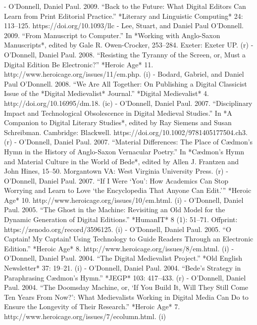 - O'Donnell, Daniel Paul. 2009. “Back to the Future: What Digital Editors Can Learn from Print Editorial Practice.” *Literary and Linguistic Computing* 24: 113–125. https:/\allowbreak{}/\allowbreak{}doi.org/\allowbreak{}10.1093/\allowbreak{}llc%
- Lee, Stuart, and Daniel Paul O'Donnell. 2009. “From Manuscript to Computer.” In *Working with Anglo-Saxon Manuscripts*, edited by Gale R. Owen-Crocker, 253–284. Exeter: Exeter UP. (r)
- O'Donnell, Daniel Paul. 2008. “Resisting the Tyranny of the Screen, or, Must a Digital Edition Be Electronic?” *Heroic Age* 11. http:/\allowbreak{}/\allowbreak{}www.heroicage.org/\allowbreak{}issues/\allowbreak{}11/\allowbreak{}em.php. (i)
- Bodard, Gabriel, and Daniel Paul O'Donnell. 2008. “We Are All Together: On Publishing a Digital Classicist Issue of the *Digital Medievalist* Journal.” *Digital Medievalist* 4. http:/\allowbreak{}/\allowbreak{}doi.org/\allowbreak{}10.16995/\allowbreak{}dm.18. (ic)
- O'Donnell, Daniel Paul. 2007. “Disciplinary Impact and Technological Obsolescence in Digital Medieval Studies.” In *A Companion to Digital Literary Studies*, edited by Ray Siemens and Susan Schreibman. Cambridge: Blackwell. https:/\allowbreak{}/\allowbreak{}doi.org/\allowbreak{}10.1002/\allowbreak{}9781405177504.ch3. (r)
- O'Donnell, Daniel Paul. 2007. “Material Differences: The Place of Cædmon's Hymn in the History of Anglo-Saxon Vernacular Poetry.” In *Cædmon's Hymn and Material Culture in the World of Bede*, edited by Allen J. Frantzen and John Hines, 15–50. Morgantown VA: West Virginia University Press. (r)
- O'Donnell, Daniel Paul. 2007. “If I Were ‘You’: How Academics Can Stop Worrying and Learn to Love ‘the Encyclopedia That Anyone Can Edit.’” *Heroic Age* 10. http:/\allowbreak{}/\allowbreak{}www.heroicage.org/\allowbreak{}issues/\allowbreak{}10/\allowbreak{}em.html. (i)
- O'Donnell, Daniel Paul. 2005. “The Ghost in the Machine: Revisiting an Old Model for the Dynamic Generation of Digital Editions.” *HumanIT* 8 (1): 51–71. Offprint: https:/\allowbreak{}/\allowbreak{}zenodo.org/\allowbreak{}record/\allowbreak{}3596125. (i)
- O'Donnell, Daniel Paul. 2005. “O Captain! My Captain! Using Technology to Guide Readers Through an Electronic Edition.” *Heroic Age* 8. http:/\allowbreak{}/\allowbreak{}www.heroicage.org/\allowbreak{}issues/\allowbreak{}8/\allowbreak{}em.html. (i)
- O'Donnell, Daniel Paul. 2004. “The Digital Medievalist Project.” *Old English Newsletter* 37: 19–21. (i)
- O'Donnell, Daniel Paul. 2004. “Bede’s Strategy in Paraphrasing Cædmon’s Hymn.” *JEGP* 103: 417–433. (r)
- O'Donnell, Daniel Paul. 2004. “The Doomsday Machine, or, ‘If You Build It, Will They Still Come Ten Years From Now?’: What Medievalists Working in Digital Media Can Do to Ensure the Longevity of Their Research.” *Heroic Age* 7. http:/\allowbreak{}/\allowbreak{}www.heroicage.org/\allowbreak{}issues/\allowbreak{}7/\allowbreak{}ecolumn.html. (i)
